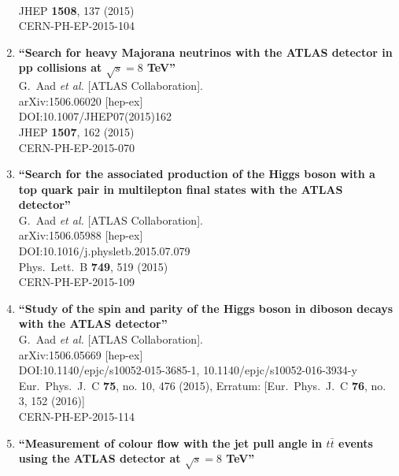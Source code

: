 \documentclass{article}
\begin{document}
\begin{enumerate}
  \\{}JHEP {\bf 1508}, 137 (2015)
  \\{}CERN-PH-EP-2015-104
\item%
{\bf ``Search for heavy Majorana neutrinos with the ATLAS detector in pp collisions at $ \sqrt{s}=8 $ TeV''}
  \\{}G.~Aad {\it et al.} [ATLAS Collaboration].
  \\{}arXiv:1506.06020 [hep-ex]
  \\{}DOI:10.1007/JHEP07(2015)162
  \\{}JHEP {\bf 1507}, 162 (2015)
  \\{}CERN-PH-EP-2015-070
\item%
{\bf ``Search for the associated production of the Higgs boson with a top quark pair in multilepton final states with the ATLAS detector''}
  \\{}G.~Aad {\it et al.} [ATLAS Collaboration].
  \\{}arXiv:1506.05988 [hep-ex]
  \\{}DOI:10.1016/j.physletb.2015.07.079
  \\{}Phys.\ Lett.\ B {\bf 749}, 519 (2015)
  \\{}CERN-PH-EP-2015-109
\item%
{\bf ``Study of the spin and parity of the Higgs boson in diboson decays with the ATLAS detector''}
  \\{}G.~Aad {\it et al.} [ATLAS Collaboration].
  \\{}arXiv:1506.05669 [hep-ex]
  \\{}DOI:10.1140/epjc/s10052-015-3685-1, 10.1140/epjc/s10052-016-3934-y
  \\{}Eur.\ Phys.\ J.\ C {\bf 75}, no. 10, 476 (2015), Erratum: [Eur.\ Phys.\ J.\ C {\bf 76}, no. 3, 152 (2016)]
  \\{}CERN-PH-EP-2015-114
\item%
{\bf ``Measurement of colour flow with the jet pull angle in $t\bar{t}$ events using the ATLAS detector at $\sqrt{s}=8$ TeV''}

\end{enumerate}
\end{document}
